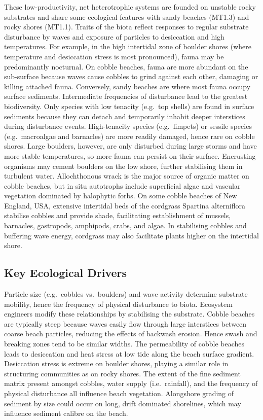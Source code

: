 \documentclass[
  letterpaper,
  DIV=11,
  numbers=noendperiod]{scrartcl}
\begin{document}
These low-productivity, net heterotrophic systems are founded on
unstable rocky substrates and share some ecological features with sandy
beaches (MT1.3) and rocky shores (MT1.1). Traits of the biota reflect
responses to regular substrate disturbance by waves and exposure of
particles to desiccation and high temperatures. For example, in the high
intertidal zone of boulder shores (where temperature and desiccation
stress is most pronounced), fauna may be predominantly nocturnal. On
cobble beaches, fauna are more abundant on the sub-surface because waves
cause cobbles to grind against each other, damaging or killing attached
fauna. Conversely, sandy beaches are where most fauna occupy surface
sediments. Intermediate frequencies of disturbance lead to the greatest
biodiversity. Only species with low tenacity (e.g.~top shells) are found
in surface sediments because they can detach and temporarily inhabit
deeper interstices during disturbance events. High-tenacity species
(e.g.~limpets) or sessile species (e.g.~macroalgae and barnacles) are
more readily damaged, hence rare on cobble shores. Large boulders,
however, are only disturbed during large storms and have more stable
temperatures, so more fauna can persist on their surface. Encrusting
organisms may cement boulders on the low shore, further stabilising them
in turbulent water. Allochthonous wrack is the major source of organic
matter on cobble beaches, but in situ autotrophs include superficial
algae and vascular vegetation dominated by halophytic forbs. On some
cobble beaches of New England, USA, extensive intertidal beds of the
cordgrass Spartina alterniflora stabilise cobbles and provide shade,
facilitating establishment of mussels, barnacles, gastropods, amphipods,
crabs, and algae. In stabilising cobbles and buffering wave energy,
cordgrass may also facilitate plants higher on the intertidal shore.

\subsection{Key Ecological Drivers}\label{key-ecological-drivers-55}

Particle size (e.g.~cobbles vs.~boulders) and wave activity determine
substrate mobility, hence the frequency of physical disturbance to
biota. Ecosystem engineers modify these relationships by stabilising the
substrate. Cobble beaches are typically steep because waves easily flow
through large interstices between coarse beach particles, reducing the
effects of backwash erosion. Hence swash and breaking zones tend to be
similar widths. The permeability of cobble beaches leads to desiccation
and heat stress at low tide along the beach surface gradient.
Desiccation stress is extreme on boulder shores, playing a similar role
in structuring communities as on rocky shores. The extent of the fine
sediment matrix present amongst cobbles, water supply (i.e.~rainfall),
and the frequency of physical disturbance all influence beach
vegetation. Alongshore grading of sediment by size could occur on long,
drift dominated shorelines, which may influence sediment calibre on the
beach.
\end{document}
